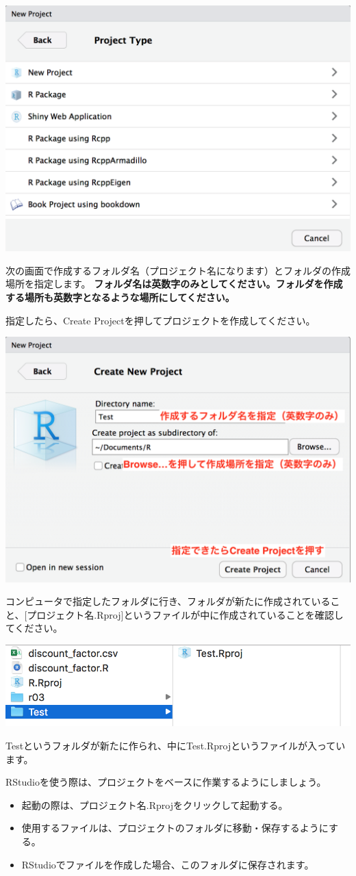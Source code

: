 \documentclass[]{book}
\providecommand{\tightlist}{%
  \setlength{\itemsep}{0pt}\setlength{\parskip}{0pt}}
\begin{document}
\begin{center}\includegraphics[width=0.5\linewidth]{image/project3} \end{center}

次の画面で作成するフォルダ名（プロジェクト名になります）とフォルダの作成場所を指定します。
\textbf{フォルダ名は英数字のみとしてください。フォルダを作成する場所も英数字となるような場所にしてください。}

指定したら、Create Projectを押してプロジェクトを作成してください。

\begin{center}\includegraphics[width=0.5\linewidth]{image/project4} \end{center}

コンピュータで指定したフォルダに行き、フォルダが新たに作成されていること、{[}プロジェクト名.Rproj{]}というファイルが中に作成されていることを確認してください。

\begin{center}\includegraphics[width=0.5\linewidth]{image/project5} \end{center}

Testというフォルダが新たに作られ、中にTest.Rprojというファイルが入っています。

RStudioを使う際は、プロジェクトをベースに作業するようにしましょう。

\begin{itemize}
\tightlist
\item
  起動の際は、プロジェクト名.Rprojをクリックして起動する。
\item
  使用するファイルは、プロジェクトのフォルダに移動・保存するようにする。
\item
  RStudioでファイルを作成した場合、このフォルダに保存されます。
\end{itemize}
\end{document}
